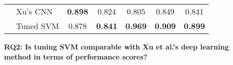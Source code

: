 \begin{table}[!htp]
{\begin{tabular} {@{}l l  c c  c c c@{}}
   & Xu's CNN& \textbf{0.898} &  0.824  & 0.805 &  0.849 &0.841 \\
   & Tuned SVM& 0.878 & \textbf{ 0.841}  &\textbf{ 0.969} &  \textbf{0.909} &\textbf{0.899} \\\hline
 \end{tabular}}
\label{tab:RQ2}
\end{table}

\textbf{RQ2: Is tuning SVM comparable with Xu et al.'s deep learning method in terms of performance scores?}
